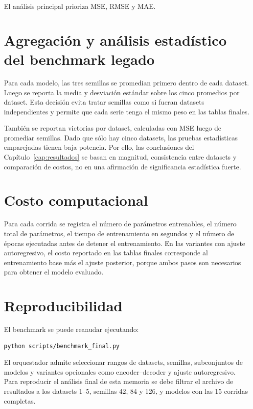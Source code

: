 El análisis principal prioriza MSE, RMSE y MAE.

\section{Agregación y análisis estadístico del benchmark legado}
\label{sec:analisis-estadistico-experimentos}

Para cada modelo, las tres semillas se promedian primero dentro de cada dataset. Luego se reporta la media y desviación estándar sobre los cinco promedios por dataset. Esta decisión evita tratar semillas como si fueran datasets independientes y permite que cada serie tenga el mismo peso en las tablas finales.

\hfill

También se reportan victorias por dataset, calculadas con MSE luego de promediar semillas. Dado que sólo hay cinco datasets, las pruebas estadísticas emparejadas tienen baja potencia. Por ello, las conclusiones del Capítulo~\ref{cap:resultados} se basan en magnitud, consistencia entre datasets y comparación de costos, no en una afirmación de significancia estadística fuerte.

\section{Costo computacional}
\label{sec:costo-computacional-experimentos}

Para cada corrida se registra el número de parámetros entrenables, el número total de parámetros, el tiempo de entrenamiento en segundos y el número de épocas ejecutadas antes de detener el entrenamiento. En las variantes con ajuste autoregresivo, el costo reportado en las tablas finales corresponde al entrenamiento base más el ajuste posterior, porque ambos pasos son necesarios para obtener el modelo evaluado.

\section{Reproducibilidad}
\label{sec:reproducibilidad}

El benchmark se puede reanudar ejecutando:
\begin{verbatim}
python scripts/benchmark_final.py
\end{verbatim}

El orquestador admite seleccionar rangos de datasets, semillas, subconjuntos de modelos y variantes opcionales como encoder--decoder y ajuste autoregresivo. Para reproducir el análisis final de esta memoria se debe filtrar el archivo de resultados a los datasets 1--5, semillas 42, 84 y 126, y modelos con las 15 corridas completas.

